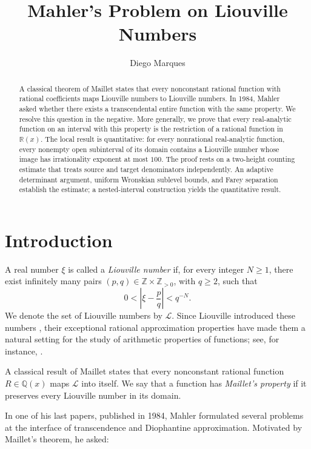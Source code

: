 \documentclass[11pt]{amsart}
\title[Mahler's Problem on Liouville Numbers]
{Mahler's Problem on Liouville Numbers}
\author{Diego Marques}
\date{}
\numberwithin{equation}{section}
\theoremstyle{definition}
\theoremstyle{remark}
\newcommand{\R}{\mathbb R}
\newcommand{\Q}{\mathbb Q}
\newcommand{\Z}{\mathbb Z}
\newcommand{\Lio}{\mathscr L}
\newcommand{\abs}[1]{\left\lvert #1\right\rvert}
\begin{document}
\begin{abstract}
A classical theorem of Maillet states that every nonconstant rational
function with rational coefficients maps Liouville numbers to Liouville numbers.
In 1984, Mahler asked whether there exists a transcendental entire
function with the same property. We resolve this question in the
negative. More generally, we prove that every real-analytic function
on an interval with this property is the restriction of a rational
function in $\R(x)$. The local result is quantitative: for every nonrational
real-analytic function, every nonempty open subinterval of its
domain contains a Liouville number whose image has irrationality
exponent at most $100$. The proof rests on a two-height counting estimate that treats
source and target denominators independently. An adaptive
determinant argument, uniform Wronskian sublevel bounds, and
Farey separation establish the estimate; a nested-interval
construction yields the quantitative result.
\end{abstract}


\maketitle

\section{Introduction}

A real number $\xi$ is called a \emph{Liouville number} if, for every
integer $N\geq1$, there exist infinitely many pairs
$(p,q)\in\Z\times\Z_{>0}$, with $q\geq2$, such that
\begin{equation}\label{eq:intro-liouville}
0<\abs{\xi-\frac pq}<q^{-N}.
\end{equation}
We denote the set of Liouville numbers by $\Lio$. Since Liouville introduced these numbers
\cite{Liouville1844,Liouville1851}, their exceptional
rational approximation properties have made them a natural setting for
the study of arithmetic properties of functions; see, for instance,
\cite{Bugeaud2004,FischlerRivoal2024,Waldschmidt2003}.

A classical result of Maillet \cite{Maillet1906} states that every
nonconstant rational function $R\in\Q(x)$ maps $\Lio$ into itself. We say that a
function has \emph{Maillet's property} if it preserves every Liouville
number in its domain.

In one of his last papers, published in 1984, Mahler
\cite{Mahler1984} formulated several problems at the interface of
transcendence and Diophantine approximation. Motivated by Maillet's
theorem, he asked:
\end{document}
